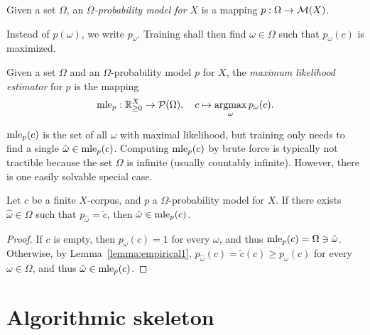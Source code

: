 \begin{definition}
 Given a set $\Omega$, an \emph{$\Omega$-probability model for $X$} is a
 mapping $p:\Omega\to\mathcal M(X)$.
\end{definition}

Instead of $p(\omega)$, we write $p_\omega$. Training shall then find
$\omega\in\Omega$ such that $p_\omega(c)$ is maximized.

\begin{definition}
 Given a set $\Omega$ and an $\Omega$-probability model $p$ for $X$, the
 \emph{maximum likelihood estimator} for $p$ is the mapping
 \[
  \mle_p: \zr_{\geq0}^X \to \up(\Omega),
  \quad
  c \mapsto \argmax_\omega p_\omega(c).
 \]
\end{definition}

$\operatorname{mle}_p(c)$ is the set of all $\omega$ with maximal likelihood, but training
only needs to find a single $\hat\omega \in \operatorname{mle}_p(c)$. Computing $\operatorname{mle}_p(c)$
by brute force is typically not tractible because the set $\Omega$ is infinite
(usually countably infinite). However, there is one easily solvable special
case.

\begin{lemma}\label{lemma:empirical2}
 Let $c$ be a finite $X$-corpus, and $p$ a $\Omega$-probability model for $X$.
 If there exists $\hat\omega\in\Omega$ such that $p_{\hat\omega} = \tilde c$,
 then $\hat\omega\in\operatorname{mle}_p(c)$.
\end{lemma}

\begin{proof}
 If $c$ is empty, then $p_\omega(c) = 1$ for every $\omega$, and thus
 $\operatorname{mle}_p(c) = \Omega \ni \hat\omega$. Otherwise, by
 Lemma~\ref{lemma:empirical1}, $p_{\hat\omega}(c) = \tilde c(c) \geq
 p_\omega(c)$ for every $\omega\in\Omega$, and thus $\hat\omega \in \operatorname{mle}_p(c)$.
\end{proof}

\section{Algorithmic skeleton}

